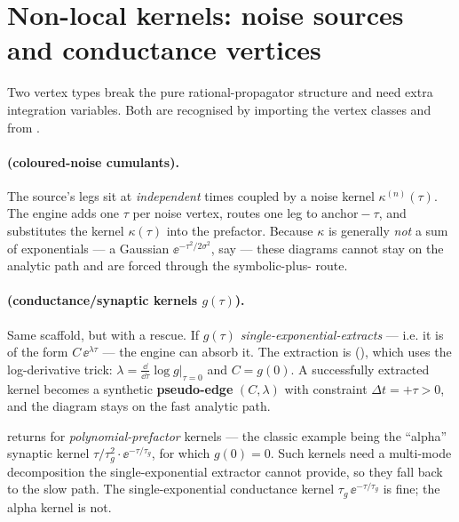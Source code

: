 \section{Non-local kernels: noise sources and conductance vertices}\label{sec:kernels}

Two vertex types break the pure rational-propagator structure and need extra
integration variables. Both are recognised by importing the vertex classes
 and  from .

\paragraph{ (coloured-noise cumulants).} The source's legs
sit at \emph{independent} times coupled by a noise kernel $\kappa^{(n)}(\tau)$.
The engine adds one $\tau$ per noise vertex, routes one leg to
$\text{anchor} - \tau$, and substitutes the kernel $\kappa(\tau)$ into the
prefactor. Because $\kappa$ is generally \emph{not} a sum of exponentials --- a
Gaussian $\ee^{-\tau^2/2\sigma^2}$, say --- these diagrams cannot stay on the
analytic path and are forced through the symbolic-plus- route.

\paragraph{ (conductance/synaptic kernels $g(\tau)$).} Same
scaffold, but with a rescue. If $g(\tau)$ \emph{single-exponential-extracts} ---
i.e. it is of the form $C\,\ee^{\lambda\tau}$ --- the engine can absorb it. The
extraction is  (), which
uses the log-derivative trick: $\lambda = \tfrac{\dd}{\dd\tau}\log g\big|_{\tau=0}$
and $C = g(0)$. A successfully extracted kernel becomes a synthetic
\textbf{pseudo-edge} $(C, \lambda)$ with constraint $\Delta t = +\tau > 0$, and
the diagram stays on the fast analytic path.

\begin{gotcha}
 returns  for \emph{polynomial-prefactor}
kernels --- the classic example being the ``alpha'' synaptic kernel
$\tau/\tau_g^2\cdot\ee^{-\tau/\tau_g}$, for which $g(0)=0$. Such kernels need a
multi-mode decomposition the single-exponential extractor cannot provide, so they
fall back to the slow path. The single-exponential conductance kernel
$\tau_g\,\ee^{-\tau/\tau_g}$ is fine; the alpha kernel is not.
\end{gotcha}

